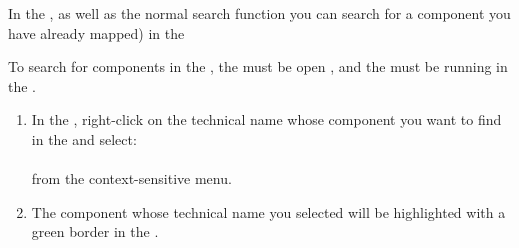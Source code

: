 \label{searchcomponentaut}
In the \gdomeditor{}, as well as the normal search function  you can search for a component you have already mapped) in the \gdaut{} 

To search for components in the \gdaut{}, the \gdomeditor{} must be open , and the \gdaut{} must be running  in the \gdomm{} .

\begin{enumerate}
\item In the \gdomeditor{}, right-click on the technical name whose component you want to find in the \gdaut{} and select:\\
\\ from the context-sensitive menu.
\item The component whose technical name you selected will be highlighted with a green border in the \gdaut{}. 

\end{enumerate}
